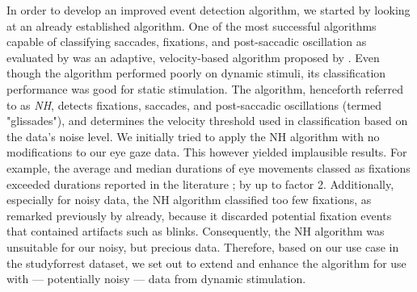 In order to develop an improved event detection algorithm, we started by looking at an already established algorithm. One of the most successful algorithms capable of classifying saccades, fixations, and post-saccadic oscillation as evaluated by \citet{Andersson2017} was an adaptive, velocity-based algorithm proposed by \citet{Nystrom2010AnData}. Even though the algorithm performed poorly on dynamic stimuli, its classification performance was good for static stimulation. The algorithm, henceforth referred to as \textit{NH}, detects fixations, saccades, and post-saccadic oscillations (termed "glissades"), and determines the velocity threshold used in classification based on the data's noise level. We initially tried to apply the NH algorithm with no modifications to our eye gaze data. This however yielded implausible results. For example, the average and median durations of eye movements classed as fixations exceeded durations reported in the literature \citep{holmqvist2011eye}; \citep{dorr2010variability} by up to factor 2. Additionally, especially for noisy data, the NH algorithm classified too few fixations, as remarked previously by \citet{Friedman2018} already, because it discarded potential fixation events that contained artifacts such as blinks. Consequently, the NH algorithm was unsuitable for our noisy, but precious data. Therefore, based on our use case in the studyforrest dataset, we set out to extend and enhance the algorithm for use with --- potentially noisy --- data from dynamic stimulation. \\

